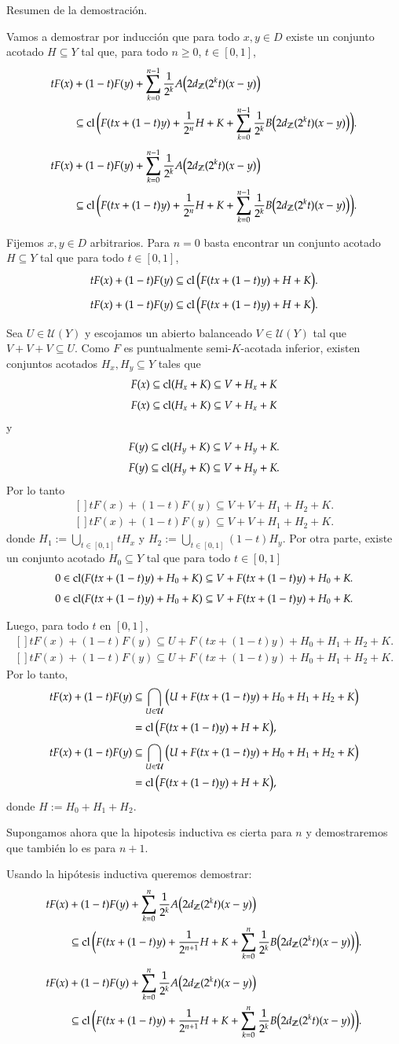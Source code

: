 \documentclass[notheorems,envcountsect,serif,mathserif,professionalfonts,spanish,10pt]{beamer}
\newcommand{\Z}{\mathbb{Z}}
\newcommand{\U}{\mathcal{U}}
\newcommand{\cl}{\mathop{\hbox{\rm cl}}\nolimits}
\theoremstyle{definition}
\def\Eq#1#2{\ifthenelse{\equal{#1}{*}}
  {\begin{equation*}\begin{aligned}[]#2\end{aligned}\end{equation*}}
  {\begin{equation}\begin{aligned}[]\label{E#1}#2\end{aligned}\end{equation}}}
\begin{document}
\begin{frame}[allowframebreaks]{Resumen de la demostración.}
	
	\begin{block}{}	
	Vamos a demostrar por inducción que para todo $x,y\in D$
	existe un conjunto acotado $H\subseteq Y$ tal que, para todo $n\geq 0$, $t\in[0,1]$, 
	\Eq{*}{
	tF(x)&+(1-t)F(y) + \sum_{k=0}^{n-1}{\dfrac{1}{2^k}A\big(2 d_{\Z}(2^k t)(x-y)\big)} \\
	&\subseteq \cl\bigg(F(tx+(1-t)y) + \dfrac{1}{2^n} H + K +
		\sum_{k=0}^{n-1}{\dfrac{1}{2^k}B\big(2 d_{\Z}(2^k t)(x-y)\big)}\bigg). 
	}
	\end{block}
	\begin{block}{}
	Fijemos $x,y\in D$ arbitrarios.
	Para $n=0$ basta encontrar un conjunto acotado $H\subseteq Y$ tal que para todo
	$t\in[0,1]$, 
	\Eq{*}{
		tF(x)+(1-t)F(y)\subseteq \cl\big(F(tx+(1-t)y) + H + K\big).
	}
	\end{block}
	
	\begin{block}{}
	Sea $U\in\U(Y)$ y escojamos un abierto balanceado $V\in\U(Y)$ tal que $V+V+V\subseteq U$.
	Como $F$ es puntualmente semi-$K$-acotada inferior, existen conjuntos acotados $H_x,H_y\subseteq Y$
	tales que 
	\Eq{*}{
	F(x) \subseteq \cl(H_x + K)\subseteq V+H_x+K
	}
	y
	\Eq{*}{
	F(y) \subseteq \cl(H_y + K) \subseteq V+H_y + K.
	} 
	Por lo tanto
	\Eq{*}{
	tF(x)+(1-t)F(y)\subseteq V + V + H_1 + H_2 + K.
	}
	donde $H_1:=\bigcup_{t\in[0,1]} tH_x$ y $H_2:=\bigcup_{t\in[0,1]} (1-t)H_y.$	
	Por otra parte, 
	existe un conjunto acotado $H_0\subseteq Y$ 
	tal que para todo $t\in[0,1]$
	\Eq{*}{
	0\in \cl(F(tx+(1-t)y) + H_0 + K)\subseteq V + F(tx+(1-t)y) + H_0 + K.
	}
	\end{block}
	
	\begin{block}{}
	Luego, para todo $t$ en $[0,1]$, 
	\Eq{*}{
	tF(x)+(1-t)F(y)\subseteq U + F(tx+(1-t)y) + H_0 + H_1 + H_2 + K.
	} 
	Por lo tanto,
	\Eq{*}{
	tF(x)+(1-t)F(y)&\subseteq \bigcap_{U\in\U}\big(U + F(tx+(1-t)y) + H_0 + H_1 + H_2 + K\big)\\
									&=\cl\big(F(tx+(1-t)y) + H + K\big),
	}
	donde $H:=H_0 + H_1 + H_2.$
	
	Supongamos ahora que la hipotesis inductiva es cierta para $n$ y demostraremos
	que también lo es para $n+1$.
	\end{block}
	
	\begin{block}{}
	Usando la hipótesis inductiva queremos demostrar:
	\Eq{*}{
	tF(x)&+(1-t)F(y) + \sum_{k=0}^{n}{\dfrac{1}{2^k}A\big(2 d_{\Z}(2^k t)(x-y)\big)} \\
	&\subseteq \cl\bigg(F(tx+(1-t)y) + \dfrac{1}{2^{n+1}} H + K +
		\sum_{k=0}^{n}{\dfrac{1}{2^k}B\big(2 d_{\Z}(2^k t)(x-y)\big)}\bigg). 
	}
	\end{block}
	

\end{frame}
\end{document}
